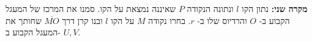 %
%
%
%

\medskip

\textbf{מקרה שני:}
נתון הקו
$l$
ונתונה הנקודה
$P$
שאיננה נמצאת על הקו. סמנו את המרכז של המעגל הקבוע ב-%
$O$
והרדיוס שלו ב-%
$r$.
בחרו נקודה
$M$
על הקו 
$l$
ובנו קרן דרך 
$\overline{MO}$
שחותך את המעגל הקבוע ב-%
$U,V$.

